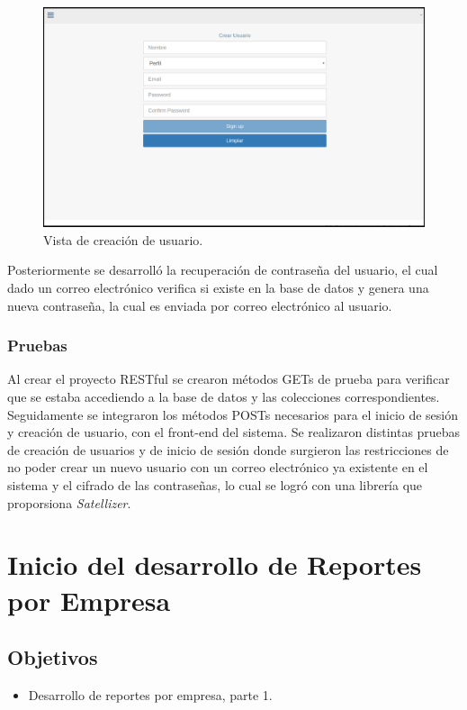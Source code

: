 \begin{figure}[ht]
  \centering
  \includegraphics[scale=0.30,type=png,ext=.png,read=.png]{imagenes/signup}
  \caption{Vista de creación de usuario.}
  \label{fig:signup}
\end{figure}

\indent Posteriormente se desarrolló la recuperación de contraseña del usuario, el cual dado un correo electrónico verifica si existe en la base de datos y genera una nueva contraseña, la cual es enviada por correo electrónico al usuario.

\subsubsection{Pruebas}
\indent Al crear el proyecto RESTful se crearon métodos GETs de prueba para verificar que se estaba accediendo a la base de datos y las colecciones correspondientes. Seguidamente se integraron los métodos POSTs necesarios para el inicio de sesión y creación de usuario, con el front-end del sistema. Se realizaron distintas pruebas de creación de usuarios y de inicio de sesión donde surgieron las restricciones de no poder crear un nuevo usuario con un correo electrónico ya existente en el sistema y el cifrado de las contraseñas, lo cual se logró con una librería que proporsiona \textit{Satellizer}.


\section{Inicio del desarrollo de Reportes por Empresa} \label{sect:Inicio del desarrollo de Reportes por Empresa}

\subsection{Objetivos}
\begin{itemize}[noitemsep,nolistsep]
\item Desarrollo de reportes por empresa, parte 1. 
\end{itemize}

